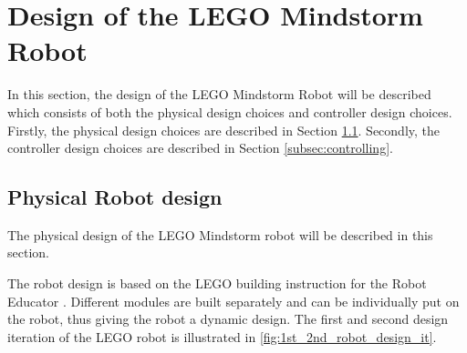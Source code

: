 \documentclass[../report.tex]{subfiles}
\begin{document}
\section{Design of the LEGO Mindstorm Robot} \label{sec:robot_design}
In this section, the design of the LEGO Mindstorm Robot will be described which consists of both the physical design choices and controller design choices. Firstly, the physical design choices are described in Section \ref{subsec:physical}. Secondly, the controller design choices are described in Section \ref{subsec:controlling}.

\subsection{Physical Robot design} \label{subsec:physical}
The physical design of the LEGO Mindstorm robot will be described in this section.

The robot design is based on the LEGO building instruction for the Robot Educator \cite{LEGO}. Different modules are built separately and can be individually put on the robot, thus giving the robot a dynamic design. The first and second design iteration of the LEGO robot is illustrated in \autoref{fig:1st_2nd_robot_design_it}.
\end{document}
